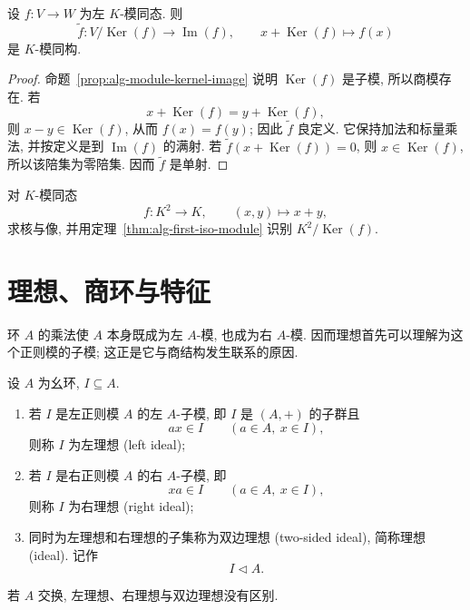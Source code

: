 \documentclass[usesamecnt, thmcnt=section, lang=cn, newtx, 10pt, scheme=chinese]{elegantbook}
\begin{document}
\begin{theorem}[模同态第一同构定理]\label{thm:alg-first-iso-module}
设 $f:V\to W$ 为左 $K$-模同态. 则
\[
 \widetilde f:V/\operatorname{Ker}(f)
 \longrightarrow \operatorname{Im}(f),
 \qquad
 x+\operatorname{Ker}(f)\longmapsto f(x)
\]
是 $K$-模同构.
\end{theorem}

\begin{proof}
命题~\ref{prop:alg-module-kernel-image} 说明 $\operatorname{Ker}(f)$ 是子模, 所以商模存在. 若
\[
 x+\operatorname{Ker}(f)=y+\operatorname{Ker}(f),
\]
则 $x-y\in\operatorname{Ker}(f)$, 从而 $f(x)=f(y)$; 因此 $\widetilde f$ 良定义. 它保持加法和标量乘法, 并按定义是到 $\operatorname{Im}(f)$ 的满射. 若 $\widetilde f(x+\operatorname{Ker}(f))=0$, 则 $x\in\operatorname{Ker}(f)$, 所以该陪集为零陪集. 因而 $\widetilde f$ 是单射.
\end{proof}

\begin{exercise}\label{ex:alg-module-first-iso-linear}
对 $K$-模同态
\[
 f:K^2\longrightarrow K,
 \qquad (x,y)\longmapsto x+y,
\]
求核与像, 并用定理~\ref{thm:alg-first-iso-module} 识别 $K^2/\operatorname{Ker}(f)$.
\end{exercise}

\section{理想、商环与特征}

环 $A$ 的乘法使 $A$ 本身既成为左 $A$-模, 也成为右 $A$-模. 因而理想首先可以理解为这个正则模的子模; 这正是它与商结构发生联系的原因.

\begin{definition}\label{def:alg-ideal}
设 $A$ 为幺环, $I\subseteq A$.
\begin{enumerate}[label=\rm(\arabic*)]
  \item 若 $I$ 是左正则模 $A$ 的左 $A$-子模, 即 $I$ 是 $(A,+)$ 的子群且
  \[
   ax\in I\qquad(a\in A,\ x\in I),
  \]
  则称 $I$ 为{\color{blue}左理想 (left ideal)};
  \item 若 $I$ 是右正则模 $A$ 的右 $A$-子模, 即
  \[
   xa\in I\qquad(a\in A,\ x\in I),
  \]
  则称 $I$ 为{\color{blue}右理想 (right ideal)};
  \item 同时为左理想和右理想的子集称为{\color{blue}双边理想 (two-sided ideal)}, 简称{\color{blue}理想 (ideal)}. 记作
  \[
   I\triangleleft A.
  \]
\end{enumerate}
若 $A$ 交换, 左理想、右理想与双边理想没有区别.
\end{definition}
\end{document}
